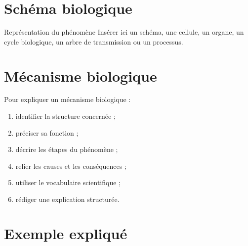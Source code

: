 \documentclass[11pt,a4paper]{article}
\begin{document}
\section{Schéma biologique}

\begin{cadregris}{Représentation du phénomène}
Insérer ici un schéma, une cellule, un organe, un cycle biologique, un arbre de transmission ou un processus.

\medskip

\begin{center}
\end{center}
\end{cadregris}

\section{Mécanisme biologique}

\begin{cadremethode}
Pour expliquer un mécanisme biologique :

\begin{enumerate}
    \item identifier la structure concernée ;
    \item préciser sa fonction ;
    \item décrire les étapes du phénomène ;
    \item relier les causes et les conséquences ;
    \item utiliser le vocabulaire scientifique ;
    \item rédiger une explication structurée.
\end{enumerate}
\end{cadremethode}

\section{Exemple expliqué}
\end{document}
